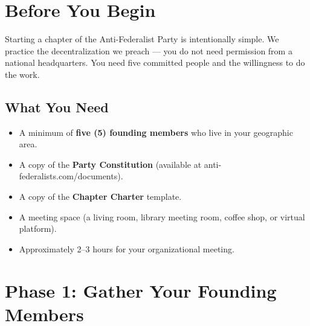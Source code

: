 \documentclass[11pt, letterpaper]{article}
\begin{document}

\tableofcontents
\newpage

\section{Before You Begin}

Starting a chapter of the Anti-Federalist Party is intentionally simple. We practice the decentralization we preach --- you do not need permission from a national headquarters. You need five committed people and the willingness to do the work.


\subsection{What You Need}
\begin{itemize}
  \item A minimum of \textbf{five (5) founding members} who live in your geographic area.
  \item A copy of the \textbf{Party Constitution} (available at anti-federalists.com/documents).
  \item A copy of the \textbf{Chapter Charter} template.
  \item A meeting space (a living room, library meeting room, coffee shop, or virtual platform).
  \item Approximately 2--3 hours for your organizational meeting.
\end{itemize}


\section{Phase 1: Gather Your Founding Members}
\end{document}
